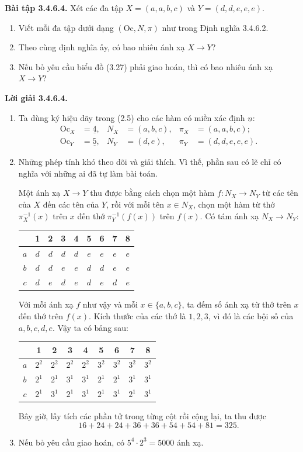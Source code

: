 \noindent\textbf{Bài tập 3.4.6.4.} Xét các đa tập $X=(a,a,b,c)$ và $Y=(d,d,e,e,e)$.
\begin{enumerate}[label=\alph*.]
\item Viết mỗi đa tập dưới dạng $(\mathrm{Oc},N,\pi)$ như trong Định nghĩa 3.4.6.2.
\item Theo cùng định nghĩa ấy, có bao nhiêu ánh xạ $X\to Y$?
\item Nếu bỏ yêu cầu biểu đồ (3.27) phải giao hoán, thì có bao nhiêu ánh xạ $X\to Y$?
\end{enumerate}
\noindent\textbf{Lời giải 3.4.6.4.}\keepwithnext
\begin{enumerate}[label=\alph*.]
\item Ta dùng ký hiệu dãy trong (2.5) cho các hàm có miền xác định $\underline n$:
\begin{align*}
\mathrm{Oc}_X&=\underline4,&N_X&=(a,b,c),&\pi_X&=(a,a,b,c);\\
\mathrm{Oc}_Y&=\underline5,&N_Y&=(d,e),&\pi_Y&=(d,d,e,e,e).
\end{align*}
\item Những phép tính khó theo dõi và giải thích. Vì thế, phần sau có lẽ chỉ có nghĩa với những ai đã tự làm bài toán.

Một ánh xạ $X\to Y$ thu được bằng cách chọn một hàm $f:N_X\to N_Y$ từ các tên của $X$ đến các tên của $Y$, rồi với mỗi tên $x\in N_X$, chọn một hàm từ thớ $\pi_X^{-1}(x)$ trên $x$ đến thớ $\pi_Y^{-1}(f(x))$ trên $f(x)$. Có tám ánh xạ $N_X\to N_Y$:
\begin{center}\begin{tabular}{c|cccccccc}&1&2&3&4&5&6&7&8\\\hline$a$&$d$&$d$&$d$&$d$&$e$&$e$&$e$&$e$\\$b$&$d$&$d$&$e$&$e$&$d$&$d$&$e$&$e$\\$c$&$d$&$e$&$d$&$e$&$d$&$e$&$d$&$e$\end{tabular}\end{center}
Với mỗi ánh xạ $f$ như vậy và mỗi $x\in\{a,b,c\}$, ta đếm số ánh xạ từ thớ trên $x$ đến thớ trên $f(x)$. Kích thước của các thớ là $1,2,3$, vì đó là các bội số của $a,b,c,d,e$. Vậy ta có bảng sau:
\begin{center}\begin{tabular}{c|cccccccc}&1&2&3&4&5&6&7&8\\\hline$a$&$2^2$&$2^2$&$2^2$&$2^2$&$3^2$&$3^2$&$3^2$&$3^2$\\$b$&$2^1$&$2^1$&$3^1$&$3^1$&$2^1$&$2^1$&$3^1$&$3^1$\\$c$&$2^1$&$3^1$&$2^1$&$3^1$&$2^1$&$3^1$&$2^1$&$3^1$\end{tabular}\end{center}
Bây giờ, lấy tích các phần tử trong từng cột rồi cộng lại, ta thu được
\[16+24+24+36+36+54+54+81=325.\]
\item Nếu bỏ yêu cầu giao hoán, có $5^4\cdot2^3=5000$ ánh xạ.
\end{enumerate}

